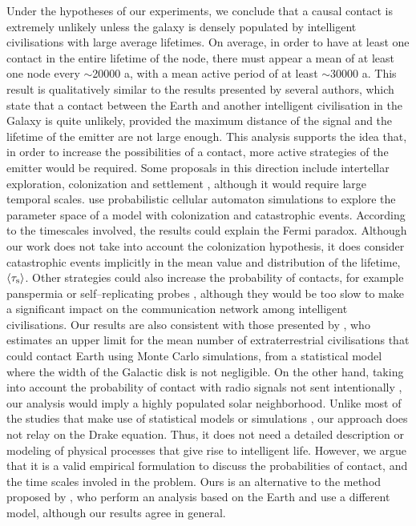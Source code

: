 \documentclass[crop]{CSLB}
\newcommand{\ceti}{node}
\begin{document}
Under the hypotheses of our experiments, we conclude that a causal
contact is extremely unlikely unless the galaxy is densely populated
by intelligent civilisations with large average lifetimes.
%
On average, in order to have at least one contact in the entire
lifetime of the \ceti{}, there must appear a mean of at least one
\ceti{} every $\sim$20000 a, with a mean active period of at least
$\sim$30000 a.
%
This result is qualitatively similar to the results presented by
several authors, which state that a contact between the Earth and
another intelligent civilisation in the Galaxy is quite unlikely,
provided the maximum distance of the signal and the lifetime of the
emitter are not large enough.
%
This analysis supports the idea that, in order to increase the
possibilities of a contact, more active strategies of the emitter
would be required.
%
Some proposals in this direction include intertellar exploration,
colonization and settlement \citep{brin_great_1983, Dosovic2019,
galera_invasion_2019}, although it would require large temporal
scales.
%
\citet{Dosovic2019} use probabilistic cellular automaton simulations
to explore the parameter space of a model with colonization and
catastrophic events.
%
According to the timescales involved, the results could explain the
Fermi paradox.
%
Although our work does not take into account the colonization
hypothesis, it does consider catastrophic events implicitly in the
mean value and distribution of the lifetime, $\left<\tau_{\rm s}\right>$.
%
Other strategies could also increase the probability of contacts, for
example panspermia \citep[e.g.,][]{starling_virulence_2013} or
self--replicating probes \citep[e.g.,][]{barlow_galactic_2013},
although they would be too slow to make a significant impact on the
communication network among intelligent civilisations.
%
Our results are also consistent with those presented by
\citet{grimaldi_signal_2017}, who estimates an upper limit for the
mean number of extraterrestrial civilisations that could contact Earth
using Monte Carlo simulations, from a statistical model where the
width of the Galactic disk is not negligible.
%
On the other hand, taking into account the probability of contact with
radio signals not sent intentionally \citep{horvat_calculating_2007},
our analysis would imply a highly populated solar neighborhood.
%
Unlike most of the studies that make use of statistical models or
simulations \citep{cirkovic_temporal_2004, smith_broadcasting_2009,
bloetscher_using_2019}, our approach does not relay on the Drake
equation.
%
Thus, it does not need a detailed description or modeling of physical
processes that give rise to intelligent life.
%
However, we argue that it is a valid empirical formulation to discuss
the probabilities of contact, and the time scales involed in the
problem.
%
Ours is an alternative to the method proposed by
\citet{balbi_impact_2018}, who perform an analysis based on the Earth
and use a different model, although our results agree in general.
\end{document}
